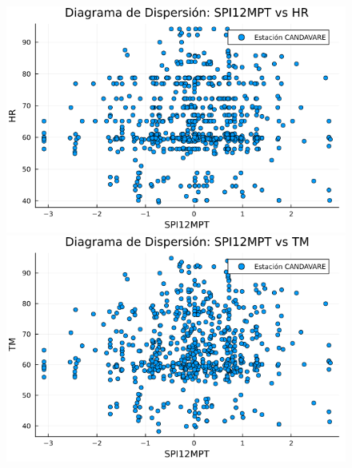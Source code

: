 \begin{figure}[htbp]
\vspace{0.5cm}  %

\begin{minipage}{0.32\textwidth}
    \centering
    \includegraphics[width=\linewidth]{Capitulos/Scaterplot/CANDAVARE_SPI12MPT_vs_HR.png}
\end{minipage}\hfill
\begin{minipage}{0.32\textwidth}
    \centering
    \includegraphics[width=\linewidth]{Capitulos/Scaterplot/CANDAVARE_SPI12MPT_vs_TM.png}
\end{minipage}\hfill
\begin{minipage}{0.32\textwidth}
    \centering

\end{minipage}
\end{figure}
